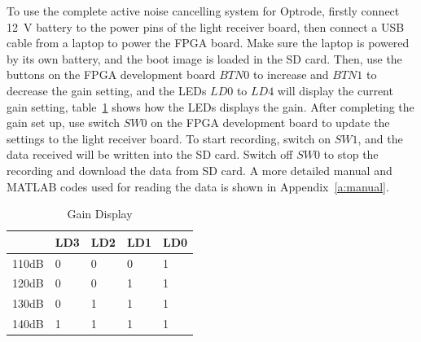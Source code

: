 To use the complete active noise cancelling system for Optrode, firstly connect \qty{12}{V} battery to the power pins of the light receiver board, then connect a USB cable from a laptop to power the FPGA board.  Make sure the laptop is powered by its own battery, and the boot image is loaded in the SD card.  Then, use the buttons on the FPGA development board $BTN0$ to increase and $BTN1$ to decrease the gain setting, and the LEDs $LD0$ to $LD4$ will display the current gain setting, table~\ref{tab_GainDisplay} shows how the LEDs displays the gain.  After completing the gain set up, use switch $SW0$ on the FPGA development board to update the settings to the light receiver board.  To start recording, switch on $SW1$, and the data received will be written into the SD card.  Switch off $SW0$ to stop the recording and download the data from SD card.  A more detailed manual and MATLAB codes used for reading the data is shown in Appendix~\ref{a:manual}.

\begin{table}[h]
\centering
\begin{tabular}{|l|l|l|l|l|}
\hline
\textbf{} & \multicolumn{1}{c|}{LD3} & \multicolumn{1}{c|}{LD2} & \multicolumn{1}{c|}{LD1} & \multicolumn{1}{c|}{LD0} \\ \hline
110dB & 0 & 0 & 0 & 1 \\ \hline
120dB & 0 & 0 & 1 & 1 \\ \hline
130dB & 0 & 1 & 1 & 1 \\ \hline
140dB & 1 & 1 & 1 & 1 \\ \hline
\end{tabular}
\caption{Gain Display}
\label{tab_GainDisplay}
\end{table}
